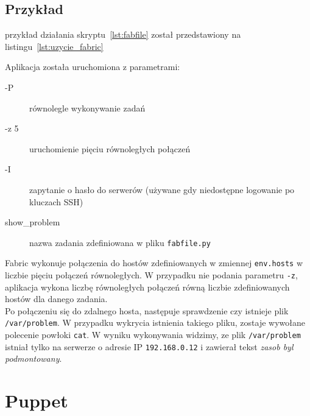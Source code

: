\subsection{Przykład}

przykład działania skryptu~\ref{lst:fabfile} został przedstawiony na listingu~\ref{lst:uzycie_fabric}

Aplikacja została uruchomiona z parametrami:
\begin{description}
\item[-P] równolegle wykonywanie zadań
\item[-z 5] uruchomienie pięciu równoległych połączeń
\item[-I] zapytanie o hasło do serwerów (używane gdy niedostępne logowanie po kluczach SSH)
\item[show\_problem] nazwa zadania zdefiniowana w pliku \texttt{fabfile.py}
\end{description}
Fabric wykonuje połączenia do hostów zdefiniowanych w zmiennej \texttt{env.hosts} w liczbie pięciu połączeń równoległych.
W przypadku nie podania parametru \texttt{-z}, aplikacja wykona liczbę równoległych połączeń równą liczbie zdefiniowanych hostów dla danego zadania.\\
Po połączeniu się do zdalnego hosta, następuje sprawdzenie czy istnieje plik \texttt{/var/problem}. W przypadku wykrycia istnienia takiego pliku, zostaje wywołane polecenie powłoki \texttt{cat}.
W wyniku wykonywania widzimy, ze plik \texttt{/var/problem} istniał tylko na serwerze o adresie IP \texttt{192.168.0.12} i zawierał tekst \textit{zasob byl podmontowany}.
\section{Puppet}

